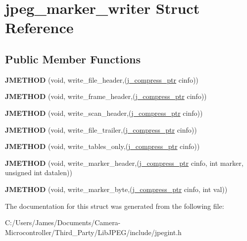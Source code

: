 \hypertarget{structjpeg__marker__writer}{}\section{jpeg\+\_\+marker\+\_\+writer Struct Reference}
\label{structjpeg__marker__writer}
\subsection*{Public Member Functions}
\begin{DoxyCompactItemize}
\item 
\mbox{\label{structjpeg__marker__writer_a7ef7423dc99932872806ce9f938f3a4d}} 
{\bfseries J\+M\+E\+T\+H\+OD} (void, write\+\_\+file\+\_\+header,(\hyperlink{structjpeg__compress__struct}{j\+\_\+compress\+\_\+ptr} cinfo))
\item 
\mbox{\label{structjpeg__marker__writer_ad1ead1439e2ea5f7941d1f9a0b94f300}} 
{\bfseries J\+M\+E\+T\+H\+OD} (void, write\+\_\+frame\+\_\+header,(\hyperlink{structjpeg__compress__struct}{j\+\_\+compress\+\_\+ptr} cinfo))
\item 
\mbox{\label{structjpeg__marker__writer_a46b660f431d78a14fc168ae79fda24fc}} 
{\bfseries J\+M\+E\+T\+H\+OD} (void, write\+\_\+scan\+\_\+header,(\hyperlink{structjpeg__compress__struct}{j\+\_\+compress\+\_\+ptr} cinfo))
\item 
\mbox{\label{structjpeg__marker__writer_ad1188df3233e332db5b8271e24f0510a}} 
{\bfseries J\+M\+E\+T\+H\+OD} (void, write\+\_\+file\+\_\+trailer,(\hyperlink{structjpeg__compress__struct}{j\+\_\+compress\+\_\+ptr} cinfo))
\item 
\mbox{\label{structjpeg__marker__writer_a792e266633294519c2d6256915ba7a95}} 
{\bfseries J\+M\+E\+T\+H\+OD} (void, write\+\_\+tables\+\_\+only,(\hyperlink{structjpeg__compress__struct}{j\+\_\+compress\+\_\+ptr} cinfo))
\item 
\mbox{\label{structjpeg__marker__writer_adc03455779fda240ca628a27dfa261f9}} 
{\bfseries J\+M\+E\+T\+H\+OD} (void, write\+\_\+marker\+\_\+header,(\hyperlink{structjpeg__compress__struct}{j\+\_\+compress\+\_\+ptr} cinfo, int marker, unsigned int datalen))
\item 
\mbox{\label{structjpeg__marker__writer_af0ffb79d6964525c1908f732040c2099}} 
{\bfseries J\+M\+E\+T\+H\+OD} (void, write\+\_\+marker\+\_\+byte,(\hyperlink{structjpeg__compress__struct}{j\+\_\+compress\+\_\+ptr} cinfo, int val))
\end{DoxyCompactItemize}


The documentation for this struct was generated from the following file\+:\begin{DoxyCompactItemize}
\item 
C\+:/\+Users/\+James/\+Documents/\+Camera-\/\+Microcontroller/\+Third\+\_\+\+Party/\+Lib\+J\+P\+E\+G/include/jpegint.\+h\end{DoxyCompactItemize}
